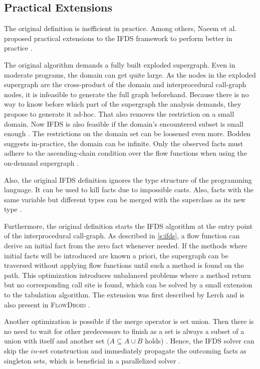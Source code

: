 \documentclass[../draft.tex]{subfiles}
\begin{document}
  
    \subsection{Practical Extensions}\label{s:ifdspractical}
    The original definition is inefficient in practice. Among others, Naeem et al. proposed practical extensions to the IFDS framework to perform better in practice \cite{Naeem2010}.

    The original algorithm demands a fully built exploded supergraph. Even in moderate programs, the domain can get quite large. As the nodes in the exploded supergraph are the cross-product of the domain and interprocedural call-graph nodes, it is infeasible to generate the full graph beforehand. Because there is no way to know before which part of the supergraph the analysis demands, they propose to generate it ad-hoc. That also removes the restriction on a small domain. Now IFDS is also feasible if the domain's encountered subset is small enough \cite{Naeem2010}.
    The restrictions on the domain set can be loosened even more. Bodden suggests in-practice, the domain can be infinite. Only the observed facts must adhere to the ascending-chain condition over the flow functions when using the on-demand supergraph \cite{Bodden2012}.
    
    Also, the original IFDS definition ignores the type structure of the programming language. It can be used to kill facts due to impossible casts. Also, facts with the same variable but different types can be merged with the superclass as its new type \cite{Naeem2010}.

    Furthermore, the original definition starts the IFDS algorithm at the entry point of the interprocedural call-graph. As described in \autoref{s:ifds}, a flow function can derive an initial fact from the zero fact whenever needed. If the methods where initial facts will be introduced are known a priori, the supergraph can be traversed without applying flow functions until such a method is found on the path. This optimization introduces unbalanced problems where a method return but no corresponding call site is found, which can be solved by a small extension to the tabulation algorithm. The extension was first described by Lerch \cite{Lerch2015} and is also present in \textsc{FlowDroid} \cite{Arzt2017PhD}.

    Another optimization is possible if the merge operator is set union. Then there is no need to wait for other predecessors to finish as a set is always a subset of a union with itself and another set ($A \subseteq A \cup B$ holds) . Hence, the IFDS solver can skip the $in$-set construction and immediately propagate the outcoming facts as singleton sets, which is beneficial in a parallelized solver \cite{Rodriguez2011}.
\end{document}
